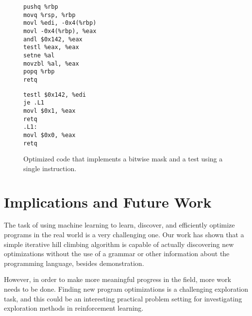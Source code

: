 \documentclass{article}
\begin{document}
\begin{figure}
    \centering
    \begin{lstlisting}
pushq %rbp
movq %rsp, %rbp
movl %edi, -0x4(%rbp)
movl -0x4(%rbp), %eax
andl $0x142, %eax
testl %eax, %eax
setne %al
movzbl %al, %eax
popq %rbp
retq
    \end{lstlisting}
    \begin{lstlisting}
testl $0x142, %edi
je .L1
movl $0x1, %eax
retq
.L1:
movl $0x0, %eax
retq
    \end{lstlisting}
    \caption{Optimized code that implements a bitwise mask and a test using a single instruction.}
    \label{fig:test_and}
\end{figure}

\section{Implications and Future Work}


The task of using machine learning to learn, discover, and efficiently optimize programs in the real world is a very challenging one. Our work has shown that a simple iterative hill climbing algorithm is capable of actually discovering new optimizations without the use of a grammar or other information about the programming language, besides demonstration. 

However, in order to make more meaningful progress in the field, more work needs to be done. Finding new program optimizations is a challenging exploration task, and this could be an interesting practical problem setting for investigating exploration methods in reinforcement learning. 
\end{document}

